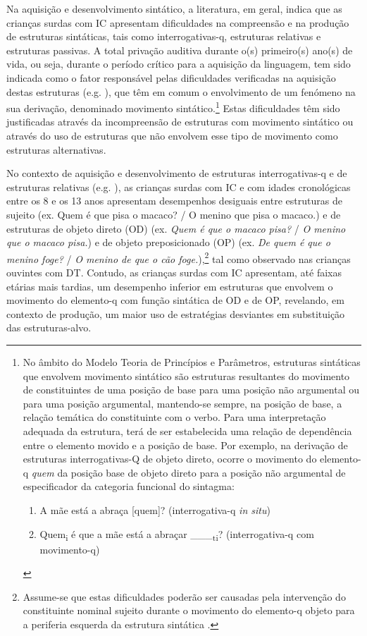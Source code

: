\documentclass[output=paper,colorlinks,citecolor=brown,booklanguage=portuguese]{langscibook}
\begin{document}
Na aquisição e desenvolvimento sintático, a literatura, em geral, indica que as crianças surdas com IC apresentam dificuldades na compreensão e na produção de estruturas sintáticas, tais como interrogativas-q, estruturas relativas e estruturas passivas. A total privação auditiva durante o(s) primeiro(s) ano(s) de vida, ou seja, durante o período crítico para a aquisição da linguagem, tem sido indicada como o fator responsável pelas dificuldades verificadas na aquisição destas estruturas (e.g. \citealp{Friedmann2006, Friedmann2011a, Ruigendijk2017}), que têm em comum o envolvimento de um fenómeno na sua derivação, denominado movimento sintático.\footnote{No âmbito do Modelo Teoria de Princípios e Parâmetros, estruturas sintáticas que envolvem movimento sintático são estruturas resultantes do movimento de constituintes de uma posição de base para uma posição não argumental ou para uma posição argumental, mantendo-se sempre, na posição de base, a relação temática do constituinte com o verbo. Para uma interpretação adequada da estrutura, terá de ser estabelecida uma relação de dependência entre o elemento movido e a posição de base. Por exemplo, na derivação de estruturas interrogativas-Q de objeto direto, ocorre o movimento do elemento-q \emph{quem} da posição base de objeto direto para a posição não argumental de especificador da categoria funcional do sintagma: 
\begin{enumerate}
\item  	A mãe está a abraça [quem]? (interrogativa-q \emph{in situ})
\item 	Quem\textsubscript{i} é que a mãe está a abraçar \_\_\_\textsubscript{ti}? (interrogativa-q com movimento-q)
\end{enumerate}} Estas dificuldades têm sido justificadas através da incompreensão de estruturas com movimento sintático ou através do uso de estruturas que não envolvem esse tipo de movimento como estruturas alternativas.

No contexto de aquisição e desenvolvimento de estruturas interrogativas-q e de estruturas relativas (e.g. \citealp{Friedmann2006, Friedmann2011a, Ruigendijk2017, Volpato2014}), as crianças surdas com IC e com idades cronológicas entre os 8 e os 13 anos apresentam desempenhos desiguais entre estruturas de sujeito (ex. Quem é que pisa o macaco? / O menino que pisa o macaco.) e de estruturas de objeto direto (OD) (ex. \emph{Quem é que o macaco pisa?} / \emph{O menino que o macaco pisa.}) e de objeto preposicionado (OP) (ex. \emph{De quem é que o menino foge?} / \emph{O menino de que o cão foge.}),\footnote{Assume-se que estas dificuldades poderão ser causadas pela intervenção do constituinte nominal sujeito durante o movimento do elemento-q objeto para a periferia esquerda da estrutura sintática \citep{Friedmann2009}.} tal como observado nas crianças ouvintes com DT. Contudo, as crianças surdas com IC apresentam, até faixas etárias mais tardias, um desempenho inferior em estruturas que envolvem o movimento do elemento-q com função sintática de OD e de OP, revelando, em contexto de produção, um maior uso de estratégias desviantes em substituição das estruturas-alvo.
\end{document}
